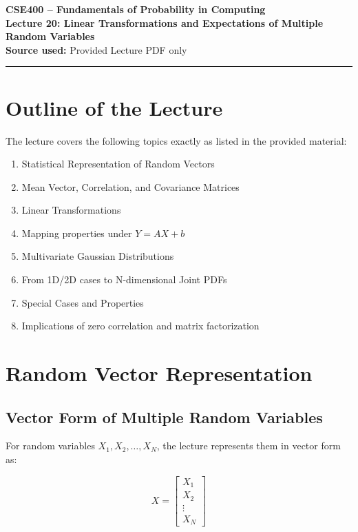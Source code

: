 \documentclass[12pt]{article}
\begin{document}
\begin{center}
{\LARGE \textbf{CSE400 -- Fundamentals of Probability in Computing}}\\[0.5em]
{\Large \textbf{Lecture 20: Linear Transformations and Expectations of Multiple Random Variables}}\\[0.5em]
\textbf{Source used:} Provided Lecture PDF only
\end{center}

\hrule
\vspace{1em}

\section{Outline of the Lecture}

The lecture covers the following topics exactly as listed in the provided material:

\begin{enumerate}
    \item Statistical Representation of Random Vectors
    \item Mean Vector, Correlation, and Covariance Matrices
    \item Linear Transformations
    \item Mapping properties under \( Y = AX + b \)
    \item Multivariate Gaussian Distributions
    \item From 1D/2D cases to N-dimensional Joint PDFs
    \item Special Cases and Properties
    \item Implications of zero correlation and matrix factorization
\end{enumerate}

\section{Random Vector Representation}

\subsection{Vector Form of Multiple Random Variables}

For random variables \( X_1, X_2, \ldots, X_N \), the lecture represents them in vector form as:

\[
X =
\begin{bmatrix}
X_1 \\
X_2 \\
\vdots \\
X_N
\end{bmatrix}
\]
\end{document}
